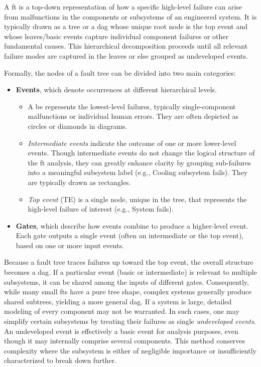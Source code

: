 A \acrfull{ft} is a top-down representation of how a specific high-level failure can arise from malfunctions in the components or subsystems of an engineered system. It is typically drawn as a tree or a \acrfull{dag} whose unique root node is the top event and whose leaves/basic events capture individual component failures or other fundamental causes. This hierarchical decomposition proceeds until all relevant failure modes are captured in the leaves or else grouped as undeveloped events.

Formally, the nodes of a fault tree can be divided into two main categories:  
\begin{itemize}
  \item \textbf{Events}, which denote occurrences at different hierarchical levels.  
    \begin{itemize}
      \item A \acrfull{be} represents the lowest-level failures, typically single-component malfunctions or individual human errors. They are often depicted as circles or diamonds in diagrams.  
      \item \emph{Intermediate events} indicate the outcome of one or more lower-level events. Though intermediate events do not change the logical structure of the \acrshort{ft} analysis, they can greatly enhance clarity by grouping sub-failures into a meaningful subsystem label (e.g., Cooling subsystem fails). They are typically drawn as rectangles.  
      \item \emph{Top event} (TE) is a single node, unique in the tree, that represents the high-level failure of interest (e.g., System fails).
    \end{itemize}
  \item \textbf{Gates}, which describe how events combine to produce a higher-level event. Each gate outputs a single event (often an intermediate or the top event), based on one or more input events.  
\end{itemize}

Because a fault tree traces failures up toward the top event, the overall structure becomes a \acrshort{dag}. If a particular event (basic or intermediate) is relevant to multiple subsystems, it can be shared among the inputs of different gates. Consequently, while many small \acrshort{ft}s have a pure tree shape, complex systems generally produce shared subtrees, yielding a more general \acrshort{dag}. If a system is large, detailed modeling of every component may not be warranted. In such cases, one may simplify certain subsystems by treating their failures as single \emph{undeveloped events}. An undeveloped event is effectively a basic event for analysis purposes, even though it may internally comprise several components. This method conserves complexity where the subsystem is either of negligible importance or insufficiently characterized to break down further.

